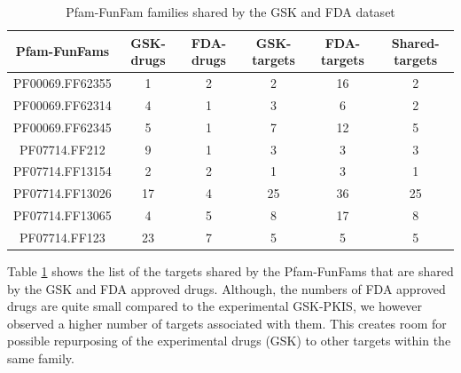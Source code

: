 \documentclass[a4paper, 11pt]{article}
\begin{document}
\begin{table}[H]
\centering
\caption{Pfam-FunFam families shared by the GSK and FDA dataset}
\label{drgfam}
\begin{tabular}{|c|c|c|c|c|c|}
\hline
Pfam-FunFams    & GSK-drugs & FDA-drugs & GSK-targets & FDA-targets & Shared-targets \\ \hline
PF00069.FF62355 & 1   & 2   & 2           & 16          & 2              \\ \hline
PF00069.FF62314 & 4   & 1   & 3           & 6           & 2              \\ \hline
PF00069.FF62345 & 5   & 1   & 7           & 12          & 5              \\ \hline
PF07714.FF212   & 9   & 1   & 3           & 3           & 3              \\ \hline
PF07714.FF13154 & 2   & 2   & 1           & 3           & 1              \\ \hline
PF07714.FF13026 & 17  & 4   & 25          & 36          & 25             \\ \hline
PF07714.FF13065 & 4   & 5   & 8           & 17          & 8              \\ \hline
PF07714.FF123   & 23  & 7   & 5           & 5           & 5              \\ \hline
\end{tabular}
\end{table}
Table \ref{drgfam} shows the list of the targets shared by the Pfam-FunFams that are shared by the GSK and FDA approved drugs. Although, the numbers of FDA approved drugs are quite small compared to the experimental GSK-PKIS, we however observed a higher number of targets associated with them. This creates room for possible repurposing of the experimental drugs (GSK) to other targets within the same family.
\end{document}
